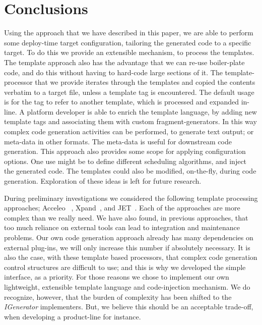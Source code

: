 \documentclass{llncs}%
\begin{document}
%
\section{Conclusions}\label{conc}
Using the approach that we have described in this paper, we are able to perform some deploy-time target configuration, tailoring the generated code to a specific target. To do this we provide an extensible mechanism, to process the templates. The template approach also has the advantage that we can re-use boiler-plate code, and do this without having to hard-code large sections of it. The template-processor that we provide iterates through the templates and copied the contents verbatim to a target file, unless a template tag is encountered. The default usage is for the tag to refer to another template, which is processed and expanded in-line. A platform developer is able to enrich the template language, by adding new template tags and associating them with custom fragment-generators. In this way complex code generation activities can be performed, to generate text output; or meta-data in other formats. The meta-data is useful for downstream code generation. This approach also provides some scope for applying configuration options. One use might be to define different scheduling algorithms, and inject the generated code. The templates could also be modified, on-the-fly, during code generation. Exploration of these ideas is left for future research. 

During preliminary investigations we considered the following template processing approaches; Acceleo~\cite{acceleo} , Xpand~\cite{xpand}, and JET~\cite{JET}. Each of the approaches are more complex than we really need. We have also found, in previous approaches, that too much reliance on external tools can lead to integration and maintenance problems. Our own code generation approach already has many dependencies on external plug-ins, we will only increase this number if absolutely necessary. It is also the case, with these template based processors, that complex code generation control structures are difficult to use; and this is why we developed the simple interface, as a priority.  For those reasons we chose to implement our own lightweight, extensible template language and code-injection mechanism. We do recognize, however, that the burden of complexity has been shifted to the \emph{IGenerator} implementers. But, we believe this should be an acceptable trade-off, when developing a product-line for instance. 
%


%
%
%
\end{document}
